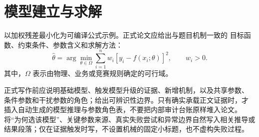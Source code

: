 \section{模型建立与求解}

以加权残差最小化为可编译公式示例。正式论文应给出与题目机制一致的
目标函数、约束条件、参数含义和求解方法：
\begin{equation}
  \hat{\theta}
  = \arg\min_{\theta \in \Omega}
    \sum_{i=1}^{n} w_i\left[y_i-f(x_i;\theta)\right]^2,
  \qquad w_i>0.
\end{equation}
其中，$\Omega$ 表示由物理、业务或竞赛规则确定的可行域。

正式写作前应说明基础模型、触发模型升级的证据、新增机制，以及共享参数、
条件参数和干扰参数的角色；给出可辨识性边界。只有确实承载正文证据时，才
插入自动生成的模型推理与参数角色表，不要把内部审计台账原样堆入论文。
将“为何选该模型”、关键参数来源、真实失败尝试和异常边界自然写入相关推导或
结果段落；仅在证据触发时写，不设置机械的固定小标题，也不虚构失败过程。
